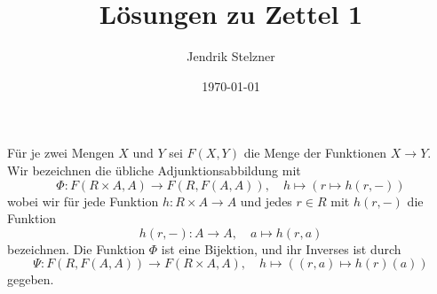 \documentclass[a4paper, 10pt, numbers=noenddot]{scrartcl}
\title{Lösungen zu Zettel 1}
\author{Jendrik Stelzner}
\date{\today}
\begin{document}
\maketitle










\section{}

Für je zwei Mengen $X$ und $Y$ sei $F(X,Y)$ die Menge der Funktionen $X \to Y$.
Wir bezeichnen die übliche Adjunktionsabbildung mit
\[
  \Phi \colon F(R \times A, A) \to F(R, F(A,A)),
  \quad
  h \mapsto (r \mapsto h(r, -))
\]
wobei wir für jede Funktion $h \colon R \times A \to A$ und jedes $r \in R$ mit $h(r,-)$ die Funktion
\[
  h(r, -) \colon A \to A,
  \quad
  a \mapsto h(r,a)
\]
bezeichnen.
Die Funktion $\Phi$ ist eine Bijektion, und ihr Inverses ist durch
\[
  \Psi \colon F(R, F(A,A)) \to F(R \times A, A),
  \quad
  h \mapsto ( (r,a) \mapsto h(r)(a) )
\]
gegeben.





\subsection{}
\end{document}
